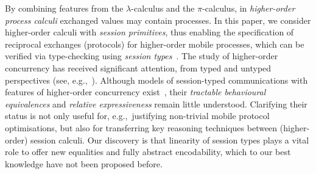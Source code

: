 \noi 
By combining features from the $\lambda$-calculus and the $\pi$-calculus, 
in \emph{higher-order process calculi} exchanged values may contain  processes. 
In this paper, we consider higher-order calculi with \emph{session primitives},
thus enabling the specification of reciprocal exchanges (protocols) 
for higher-order mobile processes, 
which can be verified via type-checking using \emph{session types}~\cite{honda.vasconcelos.kubo:language-primitives}.
The study of higher-order concurrency has received significant attention, 
from typed and untyped perspectives (see, e.g.,~\cite{ThomsenB:plachoasgcfhop,SangiorgiD:expmpa,San96int,JeffreyR05,MostrousY15,DBLP:journals/iandc/LanesePSS11,DBLP:conf/icalp/LanesePSS10,DBLP:conf/esop/KoutavasH11,XuActa2012}).
Although models of session-typed 
communications with features of higher-order concurrency exist~\cite{tlca07,DBLP:journals/jfp/GayV10},
their  \emph{tractable behavioural equivalences} and \emph{relative expressiveness}
remain little understood. 
Clarifying their status is not only useful for, 
e.g.,~justifying non-trivial mobile protocol
optimisations, but also for transferring key reasoning techniques
between (higher-order) session calculi. Our discovery 
is that linearity of session types plays a vital role to 
offer new equalities and fully abstract encodability, 
which to our best knowledge have not been proposed before.   

